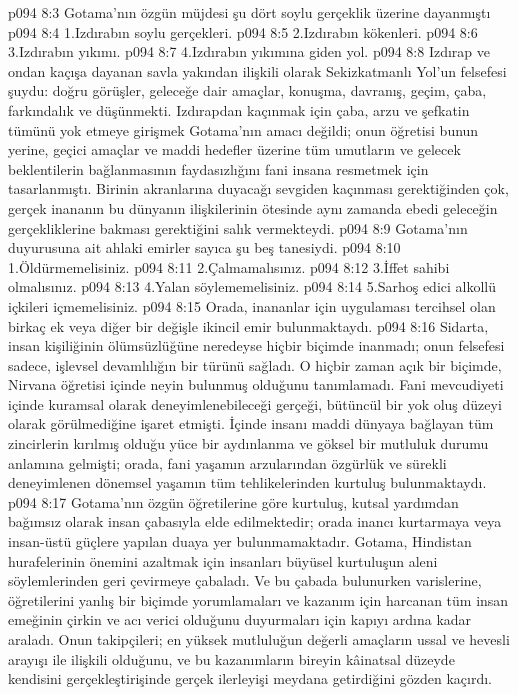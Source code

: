 \vs p094 8:3 Gotama’nın özgün müjdesi şu dört soylu gerçeklik üzerine dayanmıştı
\vs p094 8:4 1.\bibnobreakspace Izdırabın soylu gerçekleri.
\vs p094 8:5 2.\bibnobreakspace Izdırabın kökenleri.
\vs p094 8:6 3.\bibnobreakspace Izdırabın yıkımı.
\vs p094 8:7 4.\bibnobreakspace Izdırabın yıkımına giden yol.
\vs p094 8:8 Izdırap ve ondan kaçışa dayanan savla yakından ilişkili olarak Sekizkatmanlı Yol’un felsefesi şuydu: doğru görüşler, geleceğe dair amaçlar, konuşma, davranış, geçim, çaba, farkındalık ve düşünmekti. Izdırapdan kaçınmak için çaba, arzu ve şefkatin tümünü yok etmeye girişmek Gotama’nın amacı değildi; onun öğretisi bunun yerine, geçici amaçlar ve maddi hedefler üzerine tüm umutların ve gelecek beklentilerin bağlanmasının faydasızlığını fani insana resmetmek için tasarlanmıştı. Birinin akranlarına duyacağı sevgiden kaçınması gerektiğinden çok, gerçek inananın bu dünyanın ilişkilerinin ötesinde aynı zamanda ebedi geleceğin gerçekliklerine bakması gerektiğini salık vermekteydi.
\vs p094 8:9 Gotama’nın duyurusuna ait ahlaki emirler sayıca şu beş tanesiydi.
\vs p094 8:10 1.\bibnobreakspace Öldürmemelisiniz.
\vs p094 8:11 2.\bibnobreakspace Çalmamalısınız.
\vs p094 8:12 3.\bibnobreakspace İffet sahibi olmalısınız.
\vs p094 8:13 4.\bibnobreakspace Yalan söylememelisiniz.
\vs p094 8:14 5.\bibnobreakspace Sarhoş edici alkollü içkileri içmemelisiniz.
\vs p094 8:15 Orada, inananlar için uygulaması tercihsel olan birkaç ek veya diğer bir değişle ikincil emir bulunmaktaydı.
\vs p094 8:16 Sidarta, insan kişiliğinin ölümsüzlüğüne neredeyse hiçbir biçimde inanmadı; onun felsefesi sadece, işlevsel devamlılığın bir türünü sağladı. O hiçbir zaman açık bir biçimde, Nirvana öğretisi içinde neyin bulunmuş olduğunu tanımlamadı. Fani mevcudiyeti içinde kuramsal olarak deneyimlenebileceği gerçeği, bütüncül bir yok oluş düzeyi olarak görülmediğine işaret etmişti. İçinde insanı maddi dünyaya bağlayan tüm zincirlerin kırılmış olduğu yüce bir aydınlanma ve göksel bir mutluluk durumu anlamına gelmişti; orada, fani yaşamın arzularından özgürlük ve sürekli deneyimlenen dönemsel yaşamın tüm tehlikelerinden kurtuluş bulunmaktaydı.
\vs p094 8:17 Gotama’nın özgün öğretilerine göre kurtuluş, kutsal yardımdan bağımsız olarak insan çabasıyla elde edilmektedir; orada inancı kurtarmaya veya insan\hyp{}üstü güçlere yapılan duaya yer bulunmamaktadır. Gotama, Hindistan hurafelerinin önemini azaltmak için insanları büyüsel kurtuluşun aleni söylemlerinden geri çevirmeye çabaladı. Ve bu çabada bulunurken varislerine, öğretilerini yanlış bir biçimde yorumlamaları ve kazanım için harcanan tüm insan emeğinin çirkin ve acı verici olduğunu duyurmaları için kapıyı ardına kadar araladı. Onun takipçileri; en yüksek mutluluğun değerli amaçların ussal ve hevesli arayışı ile ilişkili olduğunu, ve bu kazanımların bireyin kâinatsal düzeyde kendisini gerçekleştirişinde gerçek ilerleyişi meydana getirdiğini gözden kaçırdı.
